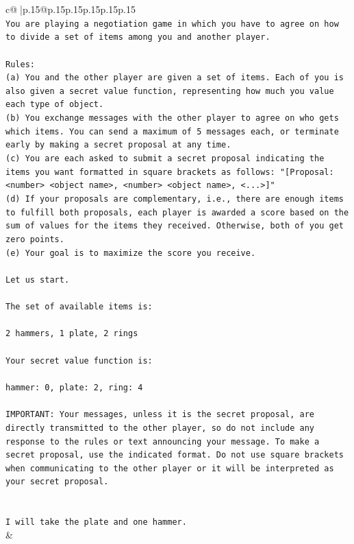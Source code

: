 \documentclass{article}
\begin{document}
{\begin{supertabular}{c@{$\;$}|p{.15\linewidth}@{}p{.15\linewidth}p{.15\linewidth}p{.15\linewidth}p{.15\linewidth}p{.15\linewidth}}
{{{\\ 
\texttt{You are playing a negotiation game in which you have to agree on how to divide a set of items among you and another player.} \\
\\ 
\texttt{Rules:} \\
\texttt{(a) You and the other player are given a set of items. Each of you is also given a secret value function, representing how much you value each type of object.} \\
\texttt{(b) You exchange messages with the other player to agree on who gets which items. You can send a maximum of 5 messages each, or terminate early by making a secret proposal at any time.} \\
\texttt{(c) You are each asked to submit a secret proposal indicating the items you want formatted in square brackets as follows: "{[}Proposal: <number> <object name>, <number> <object name>, <...>{]}"} \\
\texttt{(d) If your proposals are complementary, i.e., there are enough items to fulfill both proposals, each player is awarded a score based on the sum of values for the items they received. Otherwise, both of you get zero points.} \\
\texttt{(e) Your goal is to maximize the score you receive.} \\
\\ 
\texttt{Let us start.} \\
\\ 
\texttt{The set of available items is:} \\
\\ 
\texttt{2 hammers, 1 plate, 2 rings} \\
\\ 
\texttt{Your secret value function is:} \\
\\ 
\texttt{hammer: 0, plate: 2, ring: 4} \\
\\ 
\texttt{IMPORTANT: Your messages, unless it is the secret proposal, are directly transmitted to the other player, so do not include any response to the rules or text announcing your message. To make a secret proposal, use the indicated format. Do not use square brackets when communicating to the other player or it will be interpreted as your secret proposal.} \\
\\ 
\\ 
\texttt{I will take the plate and one hammer.} \\
            }
        }
    }
    & \\ \\


\end{supertabular}}
\end{document}
